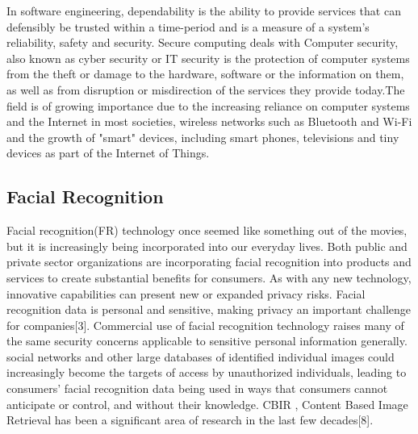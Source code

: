   \vspace*{1pc}
In software engineering, dependability is the ability to provide services that can defensibly be trusted within a time-period and  is a measure of a system's reliability, safety and security. Secure computing deals with Computer security, also known as cyber security  or IT security is the protection of computer systems from the theft or damage to the hardware, software or the information on them, as well as from disruption or misdirection of the services they provide today.The field is of growing importance due to the increasing reliance on computer systems and the Internet in most societies, wireless networks such as Bluetooth and Wi-Fi and the growth of "smart" devices, including smart phones, televisions and tiny devices as part of the Internet of Things.
\subsection[Facial Recognition]{Facial Recognition}
Facial recognition(FR) technology once seemed like something out of the movies, but it is increasingly being incorporated into our everyday lives. Both public and private sector organizations are incorporating facial recognition into products and services to create substantial benefits for consumers. As with any new technology, innovative capabilities can present new or expanded privacy risks. Facial recognition data is personal and sensitive, making privacy an important challenge for companies[3].  Commercial use of facial recognition technology raises many of the same security concerns applicable to sensitive personal information generally.  social networks and other large databases of identified individual images could increasingly become the targets of access by unauthorized individuals, leading to consumers’ facial recognition data being used in ways that consumers cannot anticipate or control, and without their knowledge. CBIR , Content Based Image Retrieval has been a significant area of research in the last few decades[8]. 

